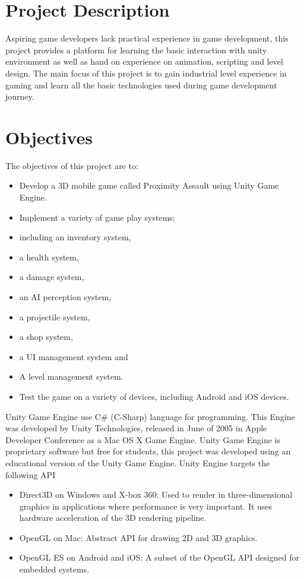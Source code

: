\section{Project Description}
Aspiring game developers lack practical experience in game development, this project provides a platform for learning the basic interaction with unity environment as well as hand on experience on animation, scripting and level design.
The main focus of this project is to gain industrial level experience in gaming and learn all the basic technologies used during game development journey.
\section{Objectives}
The objectives of this project are to:
\begin{itemize}
\item	Develop a 3D mobile game called Proximity Assault using Unity Game Engine.
\item	Implement a variety of game play systems;
\item	including an inventory system,
\item	a health system, 
\item   a damage system, 
\item	an AI perception system,
\item	a projectile system,
\item	a shop system,
\item	a UI management system and 
\item	A level management system.
\item	Test the game on a variety of devices, including Android and iOS devices.
\end{itemize}
Unity Game Engine use C\# (C-Sharp) language for programming. This Engine was developed by Unity Technologies, released in June of 2005 in Apple Developer Conference as a Mac OS X Game Engine. Unity Game Engine is proprietary software but free for students, this project was developed using an educational version of the Unity Game Engine.
Unity Engine targets the following API
\begin{itemize}
\item  {Direct3D on Windows and X-box 360:} Used to render in three-dimensional graphics in applications where performance is very important. It uses hardware acceleration of the 3D rendering pipeline.
\item {OpenGL on Mac:} Abstract API for drawing 2D and 3D graphics.
\item  {OpenGL ES on Android and iOS:} A subset of the OpenGL API designed for embedded systems.
\end{itemize}


